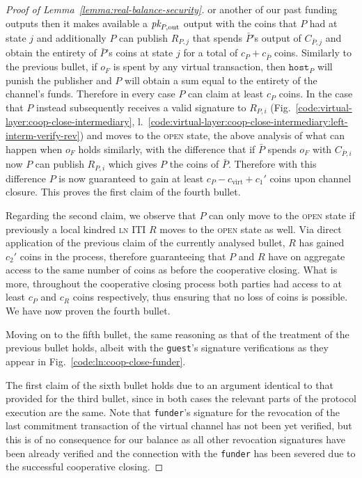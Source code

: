 \begin{proof}[Proof of Lemma~\ref{lemma:real-balance-security}]
  or another of our past funding outputs then it makes available a $\textit{pk}_{P,
  \mathrm{out}}$ output with the coins that $P$ had at state $j$ and
  additionally $P$ can publish $R_{P, j}$ that spends $\bar{P}$'s output of
  $C_{\bar{P}, j}$ and obtain the entirety of $\bar{P}$'s coins at state $j$ for
  a total of $c_P + c_{\bar{P}}$ coins. Similarly to the previous bullet, if
  $o_F$ is spent by any virtual transaction, then $\texttt{host}_P$ will punish
  the publisher and $P$ will obtain a sum equal to the entirety of the channel's
  funds. Therefore in every case $P$ can claim at least $c_P$ coins. In the case
  that $P$ instead subsequently receives a valid signature to $R_{P, i}$
  (Fig.~\ref{code:virtual-layer:coop-close-intermediary},
  l.~\ref{code:virtual-layer:coop-close-intermediary:left-interm-verify-rev})
  and moves to the \textsc{open} state, the above analysis of what can happen
  when $o_F$ holds similarly, with the difference that if $\bar{P}$ spends $o_F$
  with $C_{\bar{P}, i}$ now $P$ can publish $R_{P, i}$ which gives $P$ the coins
  of $\bar{P}$. Therefore with this difference $P$ is now guaranteed to gain at
  least $c_P - c_{\mathrm{virt}} + c_1'$ coins upon channel closure. This proves
  the first claim of the fourth bullet.

  Regarding the second claim, we observe that $P$ can only move to the
  \textsc{open} state if previously a local kindred \textsc{ln} ITI $R$ moves to
  the \textsc{open} state as well. Via direct application of the previous claim
  of the currently analysed bullet, $R$ has gained $c_2'$ coins in the process,
  therefore guaranteeing that $P$ and $R$ have on aggregate access to the same
  number of coins as before the cooperative closing. What is more, throughout
  the cooperative closing process both parties had access to at least $c_P$ and
  $c_R$ coins respectively, thus ensuring that no loss of coins is possible. We
  have now proven the fourth bullet.

  Moving on to the fifth bullet, the same reasoning as that of the treatment of
  the previous bullet holds, albeit with the \texttt{guest}'s signature
  verifications as they appear in Fig.~\ref{code:ln:coop-close-funder}.

  The first claim of the sixth bullet holds due to an argument identical to that
  provided for the third bullet, since in both cases the relevant parts of the
  protocol execution are the same. Note that \texttt{funder}'s signature for the
  revocation of the last commitment transaction of the virtual channel has not
  been yet verified, but this is of no consequence for our balance as all other
  revocation signatures have been already verified and the connection with the
  \texttt{funder} has been severed due to the successful cooperative closing.


\end{proof}
